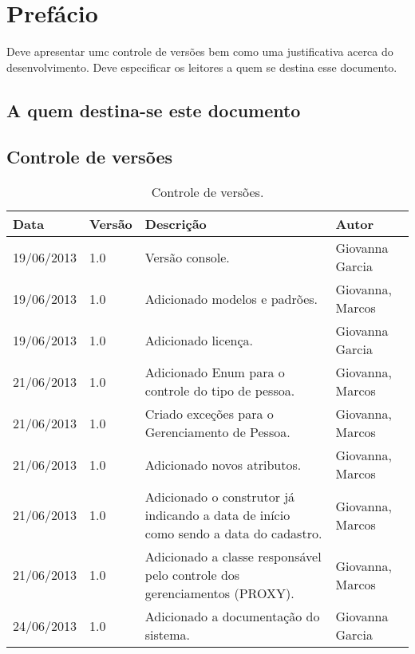 \chapter{Pref\'acio}

Deve apresentar umc controle de vers\~oes bem como uma justificativa acerca do desenvolvimento. Deve especificar os leitores a quem se destina esse documento.


\section{A quem destina-se este documento}
	


\section{Controle de vers\~oes}

\begin{table}[!htb]
	\centering	
	\label{tab:contVersao}
	\begin{tabular}{p{2cm}p{1cm}p{7cm}p{4cm}}
		\hline 
		Data & Vers\~ao & Descriç\~ao & Autor \\
		\hline
		19/06/2013 & 1.0 & Versão console. & Giovanna Garcia \\
		\hline
		19/06/2013 & 1.0 & Adicionado modelos e padrões. & Giovanna, Marcos \\
		\hline
		19/06/2013 & 1.0 & Adicionado licença. & Giovanna Garcia\\
		\hline
		21/06/2013 & 1.0 & Adicionado Enum para o controle do tipo de pessoa. & Giovanna, Marcos \\
		\hline
		21/06/2013 & 1.0 & Criado exceç\~oes para o Gerenciamento de Pessoa. & Giovanna, Marcos \\
		\hline
		21/06/2013 & 1.0 & Adicionado novos atributos. & Giovanna, Marcos\\
		\hline
		21/06/2013 & 1.0 & Adicionado o construtor j\'a indicando a data de in\'icio como sendo a data do cadastro. & Giovanna, Marcos\\
		\hline
		21/06/2013 & 1.0 & Adicionado a classe respons\'avel pelo controle dos gerenciamentos (PROXY). & Giovanna, Marcos\\
		\hline
		24/06/2013 & 1.0 & Adicionado a documentação do sistema. & Giovanna Garcia\\
		\hline 
	\end{tabular}
	\caption[Controle de vers\~oes]{Controle de vers\~oes.}
\end{table}